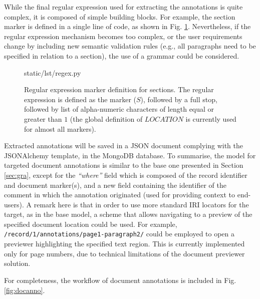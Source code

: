 While the final regular expression used for extracting the annotations is quite
complex, it is composed of simple building blocks. For example, the section
marker is defined in a single line of code, as shown in Fig. \ref{lst:regex}.
Nevertheless, if the regular expression mechanism becomes too complex, or the
user requirements change by including new semantic validation rules (e.g., all
paragraphs need to be specified in relation to a section), the use of a
grammar could be considered.

\begin{figure}[!ht]
  
    {static/lst/regex.py}
    \caption[Regular expression marker definition for sections]
            {Regular expression marker definition for sections. The regular
             expression is defined as the marker ($S$), followed by a full stop,
             followed by list of alpha-numeric characters of length equal or
             greater than $1$ (the global definition of $LOCATION$ is currently
             used for almost all markers).}
    \label{lst:regex}
\end{figure}

Extracted annotations will be saved in a JSON document complying with the
JSONAlchemy template, in the MongoDB database. To summarise, the model for
targeted document annotations is similar to the base one presented in Section
\ref{sec:gra}, except for the \textit{``where''} field which is composed of the
record identifier and document marker(s), and a new field containing the
identifier of the comment in which the annotation originated (used for
providing context to end-users). A remark here is that in order to use more
standard IRI locators for the target, as in the base model, a scheme that
allows navigating to a preview of the specified document location could be
used.  For example, \texttt{/record/1/annotations/page1-paragraph2/} could be
employed to open a previewer highlighting the specified text region. This is
currently implemented only for page numbers, due to technical limitations of
the document previewer solution.

For completeness, the workflow of document annotations is included in Fig.
\ref{fig:docanno}.

